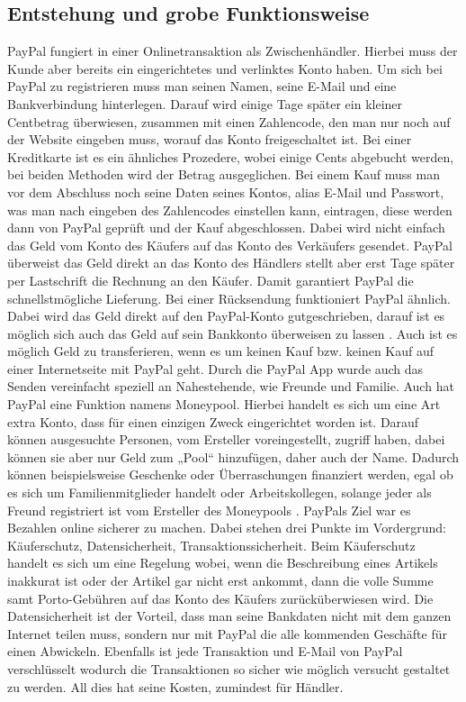 \documentclass[a4paper, 12pt]{scrartcl}
\begin{document}
    
    
    
        \subsection{Entstehung und grobe Funktionsweise}
        
        
        
        
        PayPal fungiert in einer Onlinetransaktion als Zwischenhändler. Hierbei muss der Kunde aber bereits ein eingerichtetes und verlinktes Konto haben. Um sich bei PayPal zu registrieren muss man seinen Namen, seine E-Mail und eine Bankverbindung hinterlegen. Darauf wird einige Tage später ein kleiner Centbetrag überwiesen, zusammen mit einen Zahlencode, den man nur noch auf der Website eingeben muss, worauf das Konto freigeschaltet ist. Bei einer Kreditkarte ist es ein ähnliches Prozedere, wobei einige Cents abgebucht werden, bei beiden Methoden wird der Betrag ausgeglichen. Bei einem Kauf muss man vor dem Abschluss noch seine Daten seines Kontos, alias E-Mail und Passwort, was man nach eingeben des Zahlencodes einstellen kann, eintragen, diese werden dann von PayPal geprüft und der Kauf abgeschlossen. Dabei wird nicht einfach das Geld vom Konto des Käufers auf das Konto des Verkäufers gesendet. PayPal überweist das Geld direkt an das Konto des Händlers stellt aber erst Tage später per Lastschrift die Rechnung an den Käufer. Damit garantiert PayPal die schnellstmögliche Lieferung. Bei einer Rücksendung funktioniert PayPal ähnlich. Dabei wird das Geld direkt auf den PayPal-Konto gutgeschrieben, darauf ist es möglich sich auch das Geld auf sein Bankkonto überweisen zu lassen \cite{schulz}. Auch ist es möglich Geld zu transferieren, wenn es um keinen Kauf bzw. keinen Kauf auf einer Internetseite mit PayPal geht. Durch die PayPal App wurde auch das Senden vereinfacht speziell an Nahestehende, wie Freunde und Familie. Auch hat PayPal eine Funktion namens Moneypool. Hierbei handelt es sich um eine Art extra Konto, dass für einen einzigen Zweck eingerichtet worden ist. Darauf können ausgesuchte Personen, vom Ersteller voreingestellt, zugriff haben, dabei können sie aber nur Geld zum „Pool“ hinzufügen, daher auch der Name. Dadurch können beispielsweise Geschenke oder Überraschungen finanziert werden, egal ob es sich um Familienmitglieder handelt oder Arbeitskollegen, solange jeder als Freund registriert ist vom Ersteller des Moneypools \cite{PayPal}. PayPals Ziel war es Bezahlen online sicherer zu machen. Dabei stehen drei Punkte im Vordergrund: Käuferschutz, Datensicherheit, Transaktionssicherheit. Beim Käuferschutz handelt es sich um eine Regelung wobei, wenn die Beschreibung eines Artikels inakkurat ist oder der Artikel gar nicht erst ankommt, dann die volle Summe samt Porto-Gebühren auf das Konto des Käufers zurücküberwiesen wird. Die Datensicherheit ist der Vorteil, dass man seine Bankdaten nicht mit dem ganzen Internet teilen muss, sondern nur mit PayPal die alle kommenden Geschäfte für einen Abwickeln. Ebenfalls ist jede Transaktion und E-Mail von PayPal verschlüsselt wodurch die Transaktionen so sicher wie möglich versucht gestaltet zu werden. All dies hat seine Kosten, zumindest für Händler. 
\end{document}
